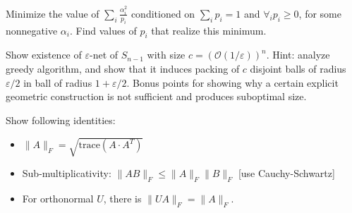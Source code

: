 \documentclass[12pt]{uebung}
\begin{document}
 

\newcommand{\bigo}{\mathcal{O}}
\renewcommand{\aufgname}{Exercise}


\begin{aufg}
Minimize the value of $\sum_{i} \frac{\alpha^2_i}{p_i}$ conditioned on $ \sum_i p_i = 1$ and $\forall_i p_i\ge0$, for some nonnegative $\alpha_i$. Find values of $p_i$ that realize this minimum.
\end{aufg}

\begin{aufg}[2+1 pts]
Show existence of $\varepsilon$-net of $S_{n-1}$ with size $c = \left(\bigo(1/\varepsilon)\right)^{n}$. Hint: analyze greedy algorithm, and show that it induces packing of $c$ disjoint balls of radius $\varepsilon/2$ in ball of radius $1+\varepsilon/2$. Bonus points for showing why a certain explicit geometric construction is not sufficient and produces suboptimal size.
\end{aufg}

\begin{aufg}[1+2+1 pts]
Show following identities:
\begin{itemize}
\item $\|A\|_F = \sqrt{\textrm{trace}(A \cdot A^T)}$
\item Sub-multiplicativity: $\|A B\|_F \le \|A\|_F \|B\|_F$  [use Cauchy-Schwartz]
\item For orthonormal $U$, there is $\|UA\|_F = \|A\|_F$.
\end{itemize}
\end{aufg}
\end{document}
